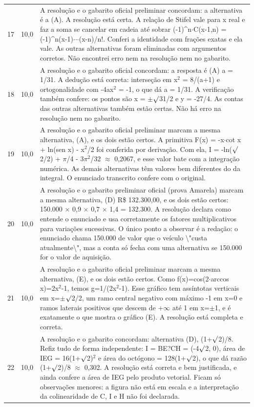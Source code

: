 \documentclass{article}%
\begin{document}
\begin{longtable}{@{}c c p{}@{}}
17 & 10,0 & A resolução e o gabarito oficial preliminar concordam: a alternativa é a (A). A resolução está certa. A relação de Stifel vale para x real e faz a soma se cancelar em cadeia até sobrar ({-}1)\^{}n$\cdot$C(x{-}1,n) = ({-}1)\^{}n(x{-}1)$\cdot$$\cdot$$\cdot$(x{-}n)/n!. Conferi a identidade com frações exatas e ela vale. As outras alternativas foram eliminadas com argumentos corretos. Não encontrei erro nem na resolução nem no gabarito. \\
18 & 10,0 & A resolução e o gabarito oficial concordam: a resposta é (A) a = 1/31. A dedução está correta: interseção em x$^2$ = 8/(a+1) e ortogonalidade com -4ax$^2$ = -1, o que dá a = 1/31. A verificação também confere: os pontos são x = $\pm$$\surd$31/2 e y = -27/4. As contas das outras alternativas também estão certas. Não há erro na resolução nem no gabarito. \\
19 & 10,0 & A resolução e o gabarito oficial preliminar marcam a mesma alternativa, (A), e os dois estão certos. A primitiva F(x) = -x$\cdot$cot x + ln(sen x) - x$^2$/2 foi conferida por derivação. Com ela, I = -ln($\surd$2/2) + $\pi$/4 - 3$\pi$$^2$/32 $\approx$ 0,2067, e esse valor bate com a integração numérica. As demais alternativas têm valores bem diferentes do da integral. O enunciado transcrito confere com o original. \\
20 & 10,0 & A resolução e o gabarito preliminar oficial (prova Amarela) marcam a mesma alternativa, (D) R\$ 132.300,00, e os dois estão certos: 150.000 $\times$ 0,9 $\times$ 0,7 $\times$ 1,4 = 132.300. A resolução declara como entende o enunciado e usa corretamente os fatores multiplicativos para variações sucessivas. O único ponto a observar é a redação: o enunciado chama 150.000 de valor que o veículo \textbackslash{}"custa atualmente\textbackslash{}", mas a conta só fecha com uma alternativa se 150.000 for o valor de aquisição. \\
21 & 10,0 & A resolução e o gabarito oficial preliminar marcam a mesma alternativa, (E), e os dois estão certos. Como f(x)=cos(2$\cdot$arccos x)=2x$^2$-1, temos g=1/(2x$^2$-1). Esse gráfico tem assíntotas verticais em x=$\pm$$\surd$2/2, um ramo central negativo com máximo -1 em x=0 e ramos laterais positivos que descem de +$\infty$ até 1 em x=$\pm$1, e é exatamente o que mostra o gráfico (E). A resolução está completa e correta. \\
22 & 10,0 & A resolução e o gabarito concordam: alternativa (D), (1+$\surd$2)/8. Refiz tudo de forma independente: I = BE?CH = (-4$\surd$2, 0), área de IEG = 16(1+$\surd$2)$^2$ e área do octógono = 128(1+$\surd$2), o que dá razão (1+$\surd$2)/8 $\approx$ 0,302. A resolução está correta e bem justificada, e ainda confere a área de IEG pelo produto vetorial. Ficam só observações menores: a figura não está em escala e a interpretação da colinearidade de C, I e H não foi declarada. \\
\bottomrule\end{longtable}%
\end{document}
